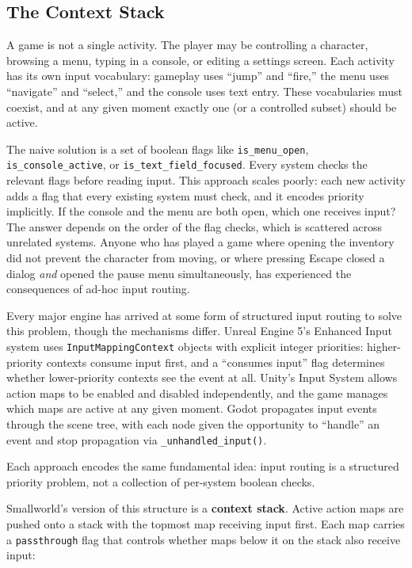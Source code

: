 \documentclass[
  11pt,
  letterpaper,
  DIV=11,
  numbers=noendperiod,
  twoside,
  open=right]{scrreprt}
\begin{document}
\subsection{The Context Stack}\label{the-context-stack}

A game is not a single activity. The player may be controlling a
character, browsing a menu, typing in a console, or editing a settings
screen. Each activity has its own input vocabulary: gameplay uses
``jump'' and ``fire,'' the menu uses ``navigate'' and ``select,'' and
the console uses text entry. These vocabularies must coexist, and at any
given moment exactly one (or a controlled subset) should be active.

The naive solution is a set of boolean flags like
\texttt{is\_menu\_open}, \texttt{is\_console\_active}, or
\texttt{is\_text\_field\_focused}. Every system checks the relevant
flags before reading input. This approach scales poorly: each new
activity adds a flag that every existing system must check, and it
encodes priority implicitly. If the console and the menu are both open,
which one receives input? The answer depends on the order of the flag
checks, which is scattered across unrelated systems. Anyone who has
played a game where opening the inventory did not prevent the character
from moving, or where pressing Escape closed a dialog \emph{and} opened
the pause menu simultaneously, has experienced the consequences of
ad-hoc input routing.

Every major engine has arrived at some form of structured input routing
to solve this problem, though the mechanisms differ. Unreal Engine 5's
Enhanced Input system uses \texttt{InputMappingContext} objects with
explicit integer priorities: higher-priority contexts consume input
first, and a ``consumes input'' flag determines whether lower-priority
contexts see the event at all. Unity's Input System allows action maps
to be enabled and disabled independently, and the game manages which
maps are active at any given moment. Godot propagates input events
through the scene tree, with each node given the opportunity to
``handle'' an event and stop propagation via
\texttt{\_unhandled\_input()}.

Each approach encodes the same fundamental idea: input routing is a
structured priority problem, not a collection of per-system boolean
checks.

Smallworld's version of this structure is a \textbf{context stack}.
Active action maps are pushed onto a stack with the topmost map
receiving input first. Each map carries a \texttt{passthrough} flag that
controls whether maps below it on the stack also receive input:
\end{document}
